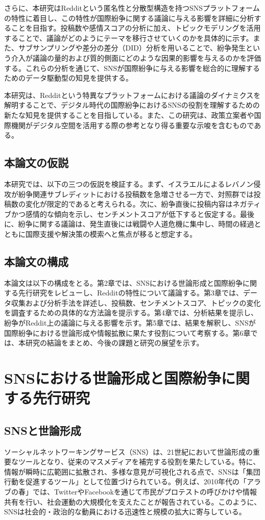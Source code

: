 \documentclass[11pt, a4j]{jreport}
\begin{document}
    さらに、本研究はRedditという匿名性と分散型構造を持つSNSプラットフォームの特性に着目し、この特性が国際紛争に関する議論に与える影響を詳細に分析することを目指す。投稿数や感情スコアの分析に加え、トピックモデリングを活用することで、議論がどのようにテーマを移行させていくのかを具体的に示す。また、サブサンプリングや差分の差分（DID）分析を用いることで、紛争発生という介入が議論の量的および質的側面にどのような因果的影響を与えるのかを評価する。これらの分析を通じて、SNSが国際紛争に与える影響を総合的に理解するためのデータ駆動型の知見を提供する。
    
    本研究は、Redditという特異なプラットフォームにおける議論のダイナミクスを解明することで、デジタル時代の国際紛争におけるSNSの役割を理解するための新たな知見を提供することを目指している。また、この研究は、政策立案者や国際機関がデジタル空間を活用する際の参考となり得る重要な示唆を含むものである。

    \section{本論文の仮説}
    本研究では、以下の三つの仮説を検証する。まず、イスラエルによるレバノン侵攻が紛争関連サブレディットにおける投稿数を急増させる一方で、対照群では投稿数の変化が限定的であると考えられる。次に、紛争直後に投稿内容はネガティブかつ感情的な傾向を示し、センチメントスコアが低下すると仮定する。最後に、紛争に関する議論は、発生直後には戦闘や人道危機に集中し、時間の経過とともに国際支援や解決策の模索へと焦点が移ると想定する。
    
    \section{本論文の構成}
    本論文は以下の構成をとる。第2章では、SNSにおける世論形成と国際紛争に関する先行研究をレビューし、Redditの特性について議論する。第3章では、データ収集および分析手法を詳述し、投稿数、センチメントスコア、トピックの変化を調査するための具体的な方法論を提示する。第4章では、分析結果を提示し、紛争がReddit上の議論に与える影響を示す。第5章では、結果を解釈し、SNSが国際紛争における世論形成や情報拡散に果たす役割について考察する。第6章では、本研究の結論をまとめ、今後の課題と研究の展望を示す。

    \chapter{SNSにおける世論形成と国際紛争に関する先行研究}

    \section{SNSと世論形成}
    ソーシャルネットワーキングサービス（SNS）は、21世紀において世論形成の重要なツールとなり、従来のマスメディアを補完する役割を果たしている。特に、情報が瞬時に広範囲に拡散され、多様な意見が可視化される点で、SNSは「集団行動を促進するツール」として位置づけられている\citep{shirky2011}。例えば、2010年代の「アラブの春」では、TwitterやFacebookを通じて市民がプロテストの呼びかけや情報共有を行い、社会運動の大規模化を支えたことが報告されている\citep{hussain2013democracy}。このように、SNSは社会的・政治的な動員における迅速性と規模の拡大に寄与している。
\end{document}
